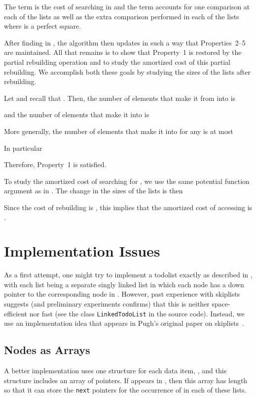 \documentclass{patmorin}
\begin{document}
The  term is the cost of searching in  and the
 term accounts for one comparison at each of the lists
 as well as the extra
comparison performed in each of the lists  where 
is a perfect square.

After finding  in , the algorithm then updates
 in such a way that Properties~2--5 are maintained.
All that remains is to show that Property~1 is restored by the partial
rebuilding operation and to study the amortized cost of this partial
rebuilding.  We accomplish both these goals by studying the sizes of the lists
 after rebuilding.

Let  and recall that . Then,
the number of elements that make it from  into  is 

and the number of elements that make it into  is

More generally, the number of elements that make it into  for any  is at most

In particular

Therefore, Property~1 is satisfied.

To study the amortized cost of searching for , we use the same
potential function argument as in .  The change in the sizes of the lists is then 

Since the cost of rebuilding  is , this implies that the amortized cost of accessing  is .


\section{Implementation Issues}


As a first attempt, one might try to implement a todolist exactly
as described in , with each list  being a
separate singly linked list in which each node has a down pointer to
the corresponding node in .  However, past experience with
skiplists suggests (and preliminary experiments confirms) that this is
neither space-efficient nor fast (see the class \texttt{LinkedTodoList}
in the source code). Instead, we use an implementation idea that appears in
Pugh's original paper on skiplists~\cite{pugh:skip}.

\subsection{Nodes as Arrays}

A better implementation uses one structure for each data item, ,
and this structure includes an array of pointers.  If  appears in
, then this array has length  so that it can
store the \texttt{next} pointers for the occurrence of  in each of
these lists.  
\end{document}
